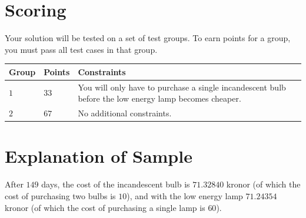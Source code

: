 \section*{Scoring}
Your solution will be tested on a set of test groups.
To earn points for a group, you must pass all test cases in that group.

\noindent
\begin{tabular}{| l | l | p{12cm} |}
  \hline
  \textbf{Group} & \textbf{Points} & \textbf{Constraints} \\ \hline
  $1$    & $33$        & You will only have to purchase a single incandescent bulb before the low energy lamp becomes cheaper. \\ \hline
  $2$    & $67$        & No additional constraints. \\ \hline
\end{tabular}


\section*{Explanation of Sample}
After $149$ days, the cost of the incandescent bulb is $71.32840$ kronor (of which the cost of purchasing two bulbs is $10$), and with the low energy lamp $71.24354$ kronor (of which the cost of purchasing a single lamp is $60$).
